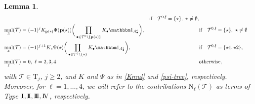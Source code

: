 \documentclass[%
11pt,  reqno]{amsart}
\makeatletter
\newcommand{\I}{\hspace{0.2mm}\textup{I}\hspace{0.2mm}}
\newcommand{\II}{\textup{I \hspace{-2.9mm} I} }
\newcommand{\III}{\textup{I \hspace{-2.9mm} I \hspace{-2.9mm} I}}
\newcommand{\IV}{\textup{I \hspace{-2.9mm} V}}
\newcommand{\5}{\textup{V}}
\newcommand{\ind}{\mathbbm 1}
\newtheorem{lemma}[theorem]{Lemma}
\theoremstyle{remark}
\newcommand{\bul}{\bullet}
\newcommand{\TT}{\mathcal{T}}
\newcommand{\Tr}{\mathrm{T}}
\newcommand{\bfrak}{\mathfrak{b}}
\newcommand{\gfrak}{\mathfrak{g}}
\newcommand{\pb}{\mathbf{p}}
\renewcommand{\l}{\ell}
\newcommand{\ff}{\mathfrak{f}}
\DeclareMathOperator{\mul}{mul}
\def\<#1>{\csname MH@symb@#1\endcsname}
\numberwithin{equation}{section}
\numberwithin{theorem}{section}
\newcommand{\NN}{\mathrm{N}}
\makeatother
\begin{document}
\begin{lemma}
\begin{align}
    && \text{if} \quad  \TT^{0,\ff} = \{\star\}, \ \star\neq \emptyset, 
    \\
    \mul_3(\TT)&=(-1)^{j}  K_{\pb(\star)}\Psi(\pb(\star)) \bigg( \prod_{\bul \in \TT^0 \setminus\{\pb(\star)\}}  K_\bul  \ind_{A_\bul^c} \bigg),
    &&
    \text{if} \quad  \TT^{0,\ff} = \{\star\},  \ \star\neq \emptyset
    \label{wint0c}
    \\
     \mul_4(\TT)&=(-1)^{j+1}  K_\star\Psi(\star) \bigg( \prod_{\bul \in \TT^0 \setminus\{\star\}}  K_\bul  \ind_{A_\bul^c} \bigg), 
    && \text{if} \quad  \TT^{0,\ff} = \{\star1, \star2\}, 
    \\
    \mul_{\l}(\TT) & = 0, \ \l=2,3,4 && \text{otherwise}, 
\end{align}
with $\TT\in \Tr_j$,  $j \ge 2$, and $K$ and $\Psi$ as in \eqref{Kmul} and \eqref{psi-tree}, respectively.
Moreover, for $\l=1,\ldots, 4$, we will refer to the contributions $\NN_\l(\TT) $ as terms of Type $\I,\II,\III,\IV$, respectively. 


 


\end{lemma}
\end{document}
